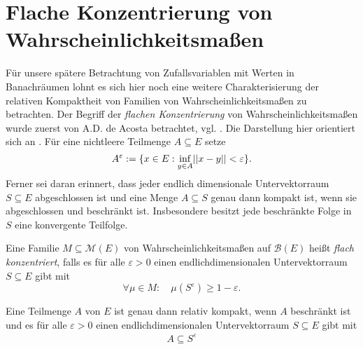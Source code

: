 \section{Flache Konzentrierung von Wahrscheinlichkeitsmaßen}
Für unsere spätere Betrachtung von Zufallsvariablen mit Werten in Banachräumen lohnt es sich hier noch eine weitere Charakterisierung der relativen Kompaktheit von Familien von Wahrscheinlichkeitsmaßen zu betrachten. 
Der Begriff der \textit{flachen Konzentrierung} von Wahrscheinlichkeitsmaßen wurde zuerst von A.D. de Acosta betrachtet, vgl. \cite{acosta}. 
Die Darstellung hier orientiert sich an \cite{vakhania}. \newline 
Für eine nichtleere Teilmenge $A \subseteq E$ setze 
$$
    A^{\varepsilon} := \{x \in E: \inf_{y\in A}\lvert\lvert x-y \rvert\rvert < \varepsilon \}.
$$
Ferner sei daran erinnert, dass jeder endlich dimensionale Untervektorraum  $S \subseteq E$ abgeschlossen ist und eine Menge $A \subseteq S$ genau dann kompakt ist, wenn sie abgeschlossen und beschränkt ist. 
Insbesondere besitzt jede beschränkte Folge in $S$ eine konvergente Teilfolge. 
\begin{mydef}
    Eine Familie $M \subseteq \mathcal{M}(E)$ von Wahrscheinlichkeitsmaßen auf $\mathcal{B}(E)$ heißt \textit{flach konzentriert}, falls es für alle $\varepsilon > 0$ einen endlichdimensionalen 
    Untervektorraum $S \subseteq E$ gibt mit 
    $$
        \forall \mu \in M: \quad \mu(S^{\varepsilon}) \geq 1 - \varepsilon.
    $$ 
\end{mydef}

\begin{lemma}
    Eine Teilmenge $A$ von $E$ ist genau dann relativ kompakt, wenn $A$ beschränkt ist und es für alle $\varepsilon > 0$ einen endlichdimensionalen Untervektorraum $S \subseteq E$ gibt mit 
    \begin{align*}
        A \subseteq S^{\varepsilon}
    \end{align*}
\end{lemma}

